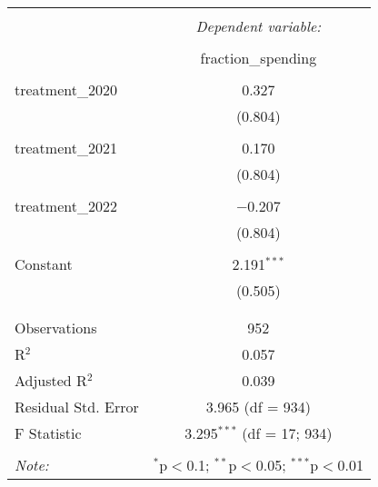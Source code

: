 
\begin{table}[!htbp] \centering 
  \caption{} 
  \label{} 
\begin{tabular}{@{\extracolsep{5pt}}lc} 
\\[-1.8ex]\hline 
\hline \\[-1.8ex] 
 & \multicolumn{1}{c}{\textit{Dependent variable:}} \\ 
\cline{2-2} 
\\[-1.8ex] & fraction\_spending \\ 
\hline \\[-1.8ex] 
 treatment\_2020 & 0.327 \\ 
  & (0.804) \\ 
  & \\ 
 treatment\_2021 & 0.170 \\ 
  & (0.804) \\ 
  & \\ 
 treatment\_2022 & $-$0.207 \\ 
  & (0.804) \\ 
  & \\ 
 Constant & 2.191$^{***}$ \\ 
  & (0.505) \\ 
  & \\ 
\hline \\[-1.8ex] 
Observations & 952 \\ 
R$^{2}$ & 0.057 \\ 
Adjusted R$^{2}$ & 0.039 \\ 
Residual Std. Error & 3.965 (df = 934) \\ 
F Statistic & 3.295$^{***}$ (df = 17; 934) \\ 
\hline 
\hline \\[-1.8ex] 
\textit{Note:}  & \multicolumn{1}{r}{$^{*}$p$<$0.1; $^{**}$p$<$0.05; $^{***}$p$<$0.01} \\ 
\end{tabular} 
\end{table} 
